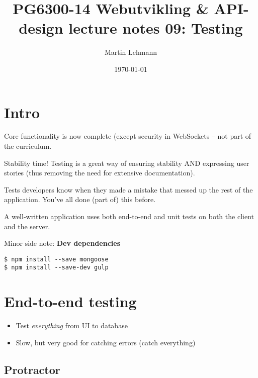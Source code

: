 \documentclass[british]{article}
\title{PG6300-14 Webutvikling \& API-design lecture notes 09: Testing}
\author{Martin Lehmann}
\date{\today}
\begin{document}
\maketitle

\section{Intro}
Core functionality is now complete (except security in WebSockets -- not part of the curriculum.

Stability time! Testing is a great way of ensuring stability AND expressing user stories (thus removing the need for extensive documentation).

Tests developers know when they made a mistake that messed up the rest of the application. You've all done (part of) this before.

A well-written application uses both end-to-end and unit tests on both the client and the server.

Minor side note: \textbf{Dev dependencies}

\begin{lstlisting}
$ npm install --save mongoose
$ npm install --save-dev gulp
\end{lstlisting}

\section{End-to-end testing}

\begin{itemize}
  \item Test \textit{everything} from UI to database
  \item Slow, but very good for catching errors (catch everything)
\end{itemize}

\subsection{Protractor}
\end{document}
